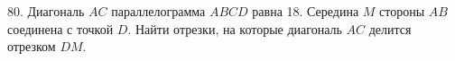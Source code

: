 80. Диагональ $AC$ параллелограмма $ABCD$ равна 18. Середина $M$ стороны $AB$ соединена с точкой $D.$ Найти отрезки, на которые диагональ $AC$ делится отрезком $DM.$\\
